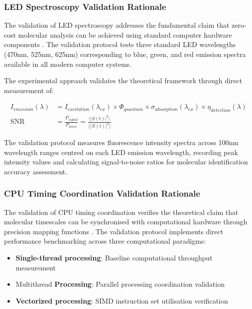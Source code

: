 \documentclass[12pt,a4paper]{article}
\begin{document}
\subsubsection{LED Spectroscopy Validation Rationale}

The validation of LED spectroscopy addresses the fundamental claim that zero-cost molecular analysis can be achieved using standard computer hardware components \cite{lakowicz2006principles}. The validation protocol tests three standard LED wavelengths (470nm, 525nm, 625nm) corresponding to blue, green, and red emission spectra available in all modern computer systems.

The experimental approach validates the theoretical framework through direct measurement of:

\begin{align}
I_{emission}(\lambda) &= I_{excitation}(\lambda_{ex}) \times \Phi_{quantum} \times \sigma_{absorption}(\lambda_{ex}) \times \eta_{detection}(\lambda) \\
\text{SNR} &= \frac{P_{signal}}{P_{noise}} = \frac{\langle |S(t)|^2 \rangle}{\langle |N(t)|^2 \rangle}
\end{align}

The validation protocol measures fluorescence intensity spectra across 100nm wavelength ranges centred on each LED emission wavelength, recording peak intensity values and calculating signal-to-noise ratios for molecular identification accuracy assessment.

\subsubsection{CPU Timing Coordination Validation Rationale}

The validation of CPU timing coordination verifies the theoretical claim that molecular timescales can be synchronised with computational hardware through precision mapping functions \cite{hennessy2019computer}. The validation protocol implements direct performance benchmarking across three computational paradigms:

\begin{itemize}
\item \textbf{Single-thread processing}: Baseline computational throughput measurement
\item Multithread \textbf{Processing}: Parallel processing coordination validation
\item \textbf{Vectorized processing}: SIMD instruction set utilisation verification
\end{itemize}
\end{document}
